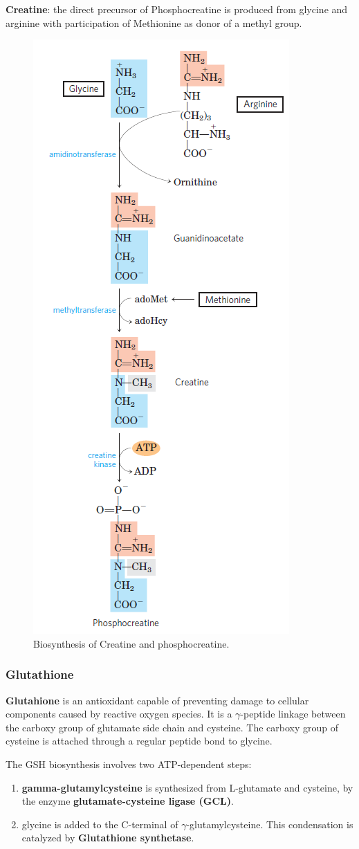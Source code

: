 \documentclass[../main.tex]{subfiles}
\begin{document}
\textbf{\gls{Creatine}}: the direct precursor of Phosphocreatine is produced from glycine and arginine with participation of Methionine as donor of a methyl group.

\begin{figure}[H]
	\centering
	\includegraphics[width=0.3\linewidth]{creatine}
	\caption{Biosynthesis of Creatine and phosphocreatine.}
	\label{fig:creatine}
\end{figure}


\subsubsection{Glutathione}

\textbf{\gls{Glutahione}} is an antioxidant capable of preventing damage to cellular components caused by reactive oxygen species. It is a $\gamma$-peptide linkage between the carboxy group of glutamate side chain and cysteine. The carboxy group of cysteine is attached through a regular peptide bond to glycine. 

The GSH biosynthesis involves two ATP-dependent steps:
\begin{enumerate}
	\item \textbf{\gls{gamma-glutamylcysteine}} is synthesized from L-glutamate and cysteine, by the enzyme \textbf{\gls{glutamate-cysteine ligase (GCL)}}.
	\item glycine is added to the C-terminal of $\gamma$-glutamylcysteine. This condensation is catalyzed by \textbf{\gls{Glutathione synthetase}}.
\end{enumerate}
\end{document}
